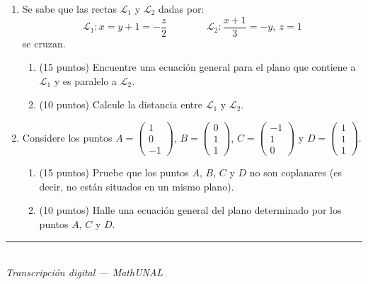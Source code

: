 \documentclass[11pt]{article}
\newcommand{\vectiii}[3]{\begin{pmatrix}#1\\#2\\#3\end{pmatrix}}
\newcommand{\examfooter}{%
  \vfill
  \rule{\linewidth}{0.4pt}\\[1pt]
  {\scriptsize\textit{Transcripción digital --- MathUNAL}\hfill\textcolor{unalblue}{\textbf{\thepage}}}
}
\begin{document}
\begin{enumerate}
\item Se sabe que las rectas $\mathcal{L}_1$ y $\mathcal{L}_2$ dadas por:
$$\mathcal{L}_1: x=y+1=-\frac{z}{2}\qquad\qquad \mathcal{L}_2:\frac{x+1}{3}=-y,\ z=1$$
se cruzan.

\begin{enumerate}[label=(\alph*)]
\item (15 puntos) Encuentre una ecuación general para el plano que contiene a $\mathcal{L}_1$ y es paralelo a $\mathcal{L}_2$.
\item (10 puntos) Calcule la distancia entre $\mathcal{L}_1$ y $\mathcal{L}_2$.
\end{enumerate}

\item Considere los puntos $A=\vectiii{1}{0}{-1}$, $B=\vectiii{0}{1}{1}$, $C=\vectiii{-1}{1}{0}$ y $D=\vectiii{1}{1}{1}$.

\begin{enumerate}[label=(\alph*)]
\item (15 puntos) Pruebe que los puntos $A$, $B$, $C$ y $D$ no son coplanares (es decir, no están situados en un mismo plano).
\item (10 puntos) Halle una ecuación general del plano determinado por los puntos $A$, $C$ y $D$.
\end{enumerate}

\end{enumerate}

\examfooter
\end{document}

